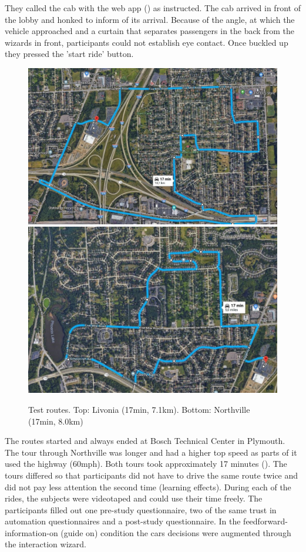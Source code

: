 They called the cab with the web app (\emph{}) as instructed. The cab arrived in front of the lobby and honked to inform of its arrival. Because of the angle, at which the vehicle approached and a curtain that separates passengers in the back from the wizards in front, participants could not establish eye contact. Once buckled up they pressed the 'start ride' button. 
\begin{figure}
     \includegraphics[width=\textwidth]{fig/RouteA_Mittel.JPG}\hfill\includegraphics[width=\textwidth]{fig/RouteB_Mittel.JPG}
    \caption[Test routes]{Test routes. Top: Livonia (17min, 7.1km). Bottom: Northville (17min, 8.0km)}
    \label{fig:routes}
\end{figure}
The routes started and always ended at Bosch Technical Center in Plymouth. The tour through Northville was longer and had a higher top speed as parts of it used the highway (60mph). Both tours took approximately 17 minutes (\emph{}). The tours differed so that participants did not have to drive the same route twice and did not pay less attention the second time (learning effects). 
During each of the rides, the subjects were videotaped and could use their time freely. The participants filled out one pre-study questionnaire, two of the same trust in automation questionnaires \citep{Jian2010,Koo2015} and a post-study questionnaire. In the feedforward-information-on (guide on) condition the cars decisions were augmented through the interaction wizard.


